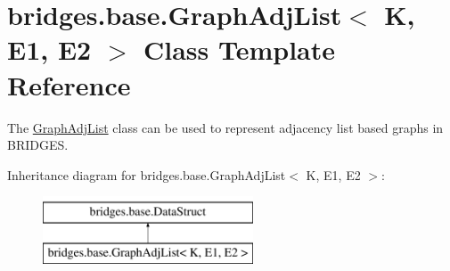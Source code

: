 \hypertarget{classbridges_1_1base_1_1_graph_adj_list}{}\section{bridges.\+base.\+Graph\+Adj\+List$<$ K, E1, E2 $>$ Class Template Reference}
\label{classbridges_1_1base_1_1_graph_adj_list}


The \hyperlink{classbridges_1_1base_1_1_graph_adj_list}{Graph\+Adj\+List} class can be used to represent adjacency list based graphs in B\+R\+I\+D\+G\+E\+S.  


Inheritance diagram for bridges.\+base.\+Graph\+Adj\+List$<$ K, E1, E2 $>$\+:\begin{figure}[H]
\begin{center}
\leavevmode
\includegraphics[height=2.000000cm]{classbridges_1_1base_1_1_graph_adj_list}
\end{center}
\end{figure}
